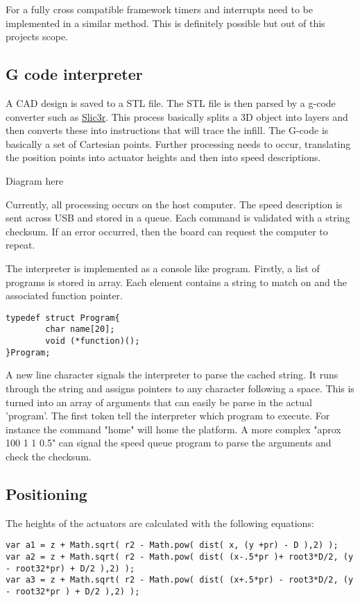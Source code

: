 \documentclass[a4paper, 11pt, twoside]{Thesis}  %
\begin{document}
For a fully cross compatible framework timers and interrupts need to be implemented in a similar method. This is definitely possible but out of this projects scope.
\subsection{G code interpreter}

A CAD design is saved to a STL file. The STL file is then parsed by a g-code converter such as \href{http://slic3r.org/}{Slic3r}. This process basically splits a 3D object into layers and then converts these into instructions that will trace the infill. The G-code is basically a set of Cartesian points. Further processing needs to occur, translating the position points into actuator heights and then into speed descriptions. 

Diagram here

Currently, all processing occurs on the host computer. The speed description is sent across USB and stored in a queue. Each command is validated with a string checksum. If an error occurred, then the board can request the computer to repeat. 

The interpreter is implemented as a console like program. Firstly, a list of programs is stored in array. Each element contains a string to match on and the associated function pointer.

\begin{lstlisting}
typedef struct Program{
        char name[20];
        void (*function)();
}Program;

\end{lstlisting}

A new line character signals the interpreter to parse the cached string. It runs through the string and assigns pointers to any character following a space. This is turned into an array of arguments that can easily be parse in the actual 'program'. The first token tell the interpreter which program to execute. For instance the command "home" will home the platform. A more complex "aprox 100 1 1 0.5" can signal the speed queue program to parse the arguments and check the checksum.
\subsection{Positioning}

The heights of the actuators are calculated with the following equations:

\begin{lstlisting}
var a1 = z + Math.sqrt( r2 - Math.pow( dist( x, (y +pr) - D ),2) );
var a2 = z + Math.sqrt( r2 - Math.pow( dist( (x-.5*pr )+ root3*D/2, (y - root32*pr) + D/2 ),2) );
var a3 = z + Math.sqrt( r2 - Math.pow( dist( (x+.5*pr) - root3*D/2, (y - root32*pr ) + D/2 ),2) );

\end{lstlisting}
\end{document}
